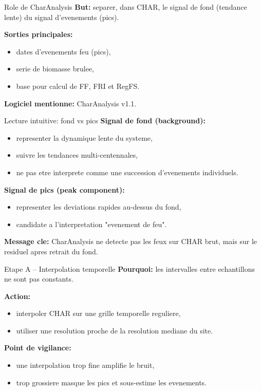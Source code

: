 \documentclass[aspectratio=169,11pt]{beamer}
\begin{document}
\begin{frame}{Role de CharAnalysis}
\textbf{But:} separer, dans CHAR, le signal de fond (tendance lente) du signal d'evenements (pics).

\vspace{0.2cm}
\textbf{Sorties principales:}
\begin{itemize}
  \item dates d'evenements feu (pics),
  \item serie de biomasse brulee,
  \item base pour calcul de FF, FRI et RegFS.
\end{itemize}

\textbf{Logiciel mentionne:} CharAnalysis v1.1.
\end{frame}

\begin{frame}{Lecture intuitive: fond vs pics}
\textbf{Signal de fond (background):}
\begin{itemize}
  \item representer la dynamique lente du systeme,
  \item suivre les tendances multi-centennales,
  \item ne pas etre interprete comme une succession d'evenements individuels.
\end{itemize}

\textbf{Signal de pics (peak component):}
\begin{itemize}
  \item representer les deviations rapides au-dessus du fond,
  \item candidate a l'interpretation "evenement de feu".
\end{itemize}

\textbf{Message cle:} CharAnalysis ne detecte pas les feux sur CHAR brut, mais sur le residuel apres retrait du fond.
\end{frame}

\begin{frame}{Etape A -- Interpolation temporelle}
\textbf{Pourquoi:} les intervalles entre echantillons ne sont pas constants.

\textbf{Action:}
\begin{itemize}
  \item interpoler CHAR sur une grille temporelle reguliere,
  \item utiliser une resolution proche de la resolution mediane du site.
\end{itemize}

\textbf{Point de vigilance:}
\begin{itemize}
  \item une interpolation trop fine amplifie le bruit,
  \item trop grossiere masque les pics et sous-estime les evenements.
\end{itemize}
\end{frame}
\end{document}
